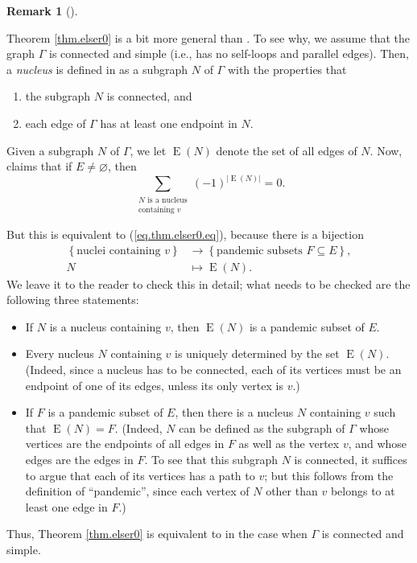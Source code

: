 \documentclass[numbers=enddot,12pt,final,onecolumn]{scrartcl}%
\theoremstyle{definition}
\newtheorem{remk}[theo]{Remark}
\newenvironment{remark}[1][]
{\begin{remk}[#1]\begin{leftbar}}
{\end{leftbar}\end{remk}}
\let\sumnonlimits\sum
\renewcommand{\sum}{\sumnonlimits\limits}
\begin{document}
\begin{remark}
Theorem \ref{thm.elser0} is a bit more general than \cite[Lemma 1]{Elser84}.
To see why, we assume that the graph $\Gamma$ is connected and simple (i.e.,
has no self-loops and parallel edges). Then, a \emph{nucleus} is defined in
\cite{Elser84} as a subgraph $N$ of $\Gamma$ with the properties that

\begin{enumerate}
\item the subgraph $N$ is connected, and

\item each edge of $\Gamma$ has at least one endpoint in $N$.
\end{enumerate}

\noindent Given a subgraph $N$ of $\Gamma$, we let $\operatorname*{E}\left(
N\right)  $ denote the set of all edges of $N$. Now, \cite[Lemma 1]{Elser84}
claims that if $E\neq\varnothing$, then%
\[
\sum_{\substack{N\text{ is a nucleus}\\\text{containing }v}}\left(  -1\right)
^{\left\vert \operatorname*{E}\left(  N\right)  \right\vert }=0.
\]


But this is equivalent to (\ref{eq.thm.elser0.eq}), because there is a
bijection%
\begin{align*}
\left\{  \text{nuclei containing }v\right\}   &  \rightarrow\left\{
\text{pandemic subsets }F\subseteq E\right\}  ,\\
N  &  \mapsto\operatorname*{E}\left(  N\right)  .
\end{align*}
We leave it to the reader to check this in detail; what needs to be checked
are the following three statements:

\begin{itemize}
\item If $N$ is a nucleus containing $v$, then $\operatorname*{E}\left(
N\right)  $ is a pandemic subset of $E$.

\item Every nucleus $N$ containing $v$ is uniquely determined by the set
$\operatorname*{E}\left(  N\right)  $. (Indeed, since a nucleus has to be
connected, each of its vertices must be an endpoint of one of its edges,
unless its only vertex is $v$.)

\item If $F$ is a pandemic subset of $E$, then there is a nucleus $N$
containing $v$ such that $\operatorname*{E}\left(  N\right)  =F$. (Indeed, $N$
can be defined as the subgraph of $\Gamma$ whose vertices are the endpoints of
all edges in $F$ as well as the vertex $v$, and whose edges are the edges in
$F$. To see that this subgraph $N$ is connected, it suffices to argue that
each of its vertices has a path to $v$; but this follows from the definition
of \textquotedblleft pandemic\textquotedblright, since each vertex of $N$
other than $v$ belongs to at least one edge in $F$.)
\end{itemize}

Thus, Theorem \ref{thm.elser0} is equivalent to \cite[Lemma 1]{Elser84} in the
case when $\Gamma$ is connected and simple.
\end{remark}
\end{document}
